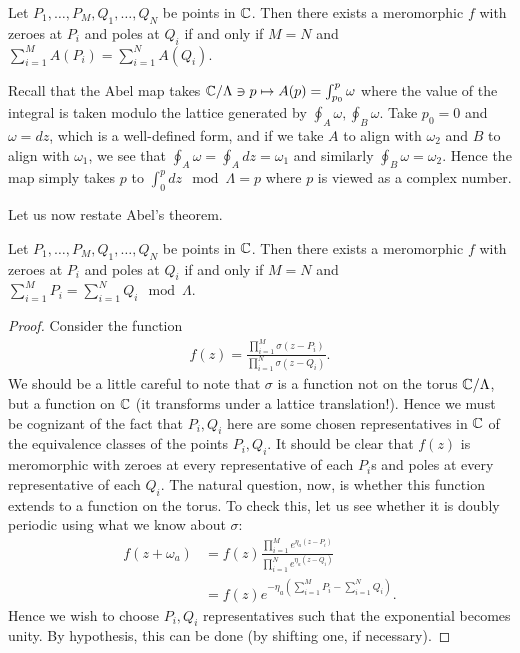 \documentclass{../mathnotes}
\begin{document}
\begin{thm}
    Let $P_1,\ldots,P_M,Q_1,\ldots,Q_N$ be points in $\mathbb{C}$. Then there exists a meromorphic $f$ with zeroes at $P_i$ and poles at $Q_i$
    if and only if $M=N$ and $\sum_{i=1}^MA(P_i)=\sum_{i=1}^NA(Q_i)$.
\end{thm}
Recall that the Abel map takes $\mathbb{C}/\Lambda\ni p\mapsto A(p)=\int_{p_0}^p\omega$ where the value of the integral is taken modulo the lattice
generated by $\oint_A\omega,\oint_B\omega$. Take $p_0=0$ and $\omega=dz$, which is a well-defined form, and if we take $A$ to align with $\omega_2$
and $B$ to align with $\omega_1$, we see that $\oint_A\omega=\oint_A dz=\omega_1$ and similarly $\oint_B\omega=\omega_2$. Hence the map simply
takes $p$ to $\int_0^p dz \mod\Lambda=p$ where $p$ is viewed as a complex number.

Let us now restate Abel's theorem.
\begin{thm}
    Let $P_1,\ldots,P_M,Q_1,\ldots,Q_N$ be points in $\mathbb{C}$. Then there exists a meromorphic $f$ with zeroes at $P_i$ and poles at $Q_i$
    if and only if $M=N$ and $\sum_{i=1}^M P_i=\sum_{i=1}^NQ_i\mod\Lambda$.
\end{thm}
\begin{proof}
    Consider the function
    \begin{align*}
        f(z)=\frac{\prod_{i=1}^M\sigma(z-P_i)}{\prod_{i=1}^N\sigma(z-Q_i)}.
    \end{align*}
    We should be a little careful to note that $\sigma$ is a function not on the torus $\mathbb{C}/\Lambda$, but a function on $\mathbb{C}$ (it transforms under a lattice
    translation!). Hence we must be cognizant of the fact that $P_i,Q_i$ here are some chosen representatives in $\mathbb{C}$ of the equivalence classes of the points $P_i,Q_i$.
    It should be clear that $f(z)$ is meromorphic with zeroes at every representative of each $P_i$s and poles at every representative of each $Q_i$.
    The natural question, now, is whether this function extends to a function on the torus. 
    To check this, let us see whether it is doubly periodic using what we know about $\sigma$:
    \begin{align*}
        f(z+\omega_a)&=f(z)\frac{\prod_{i=1}^Me^{\eta_a(z-P_i)}}{\prod_{i=1}^Ne^{\eta_a(z-Q_i)}}\\
        &=f(z)e^{-\eta_a\left( \sum_{i=1}^MP_i-\sum_{i=1}^NQ_i \right)}.
    \end{align*}
    Hence we wish to choose $P_i,Q_i$ representatives such that the exponential becomes unity. By hypothesis, this can be done (by shifting one, if necessary).
\end{proof}
\end{document}
